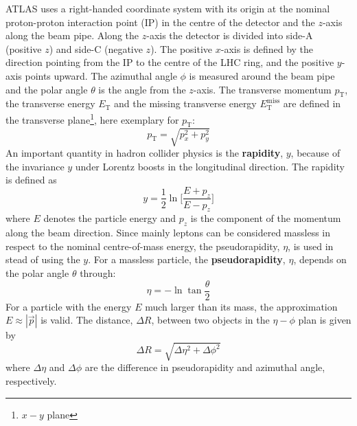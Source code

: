 ATLAS uses a right-handed coordinate system with its origin at the nominal proton-proton interaction point (IP) in the centre of the detector and the $z$-axis along the beam pipe.
Along the $z$-axis the detector is divided into side-A (positive $z$) and side-C (negative $z$).
The positive $x$-axis is defined by the direction pointing from the IP to the centre of the LHC ring, and the positive $y$-axis points upward.%
The azimuthal angle $\phi$ is measured around the beam pipe  and the polar angle $\theta$ is the angle from the $z$-axis.
The transverse momentum $p_{\mathrm{T}}$, the transverse energy $E_{\mathrm{T}}$ and the missing transverse
energy $E_{\mathrm{T}}^{\mathrm{miss}}$ are defined in the transverse plane\footnote{$x-y$ plane}, here exemplary for $p_{\mathrm{T}}$:
%
\begin{equation}
p_{\mathrm{T}}= \sqrt{p_{x}^{2} + p_{y}^{2}}
\end{equation}
%
An important quantity in hadron collider physics is the \textbf{rapidity}, $y$, because of the invariance $y$ under Lorentz boosts in the longitudinal direction.
The rapidity is defined as
%
\begin{equation}
y = \frac{1}{2} \ln\Big[\frac{E + p_{z}}{E - p_{z}}\Big]
\end{equation}
%
where $E$ denotes the particle energy and $p_{z}$  is the component of the momentum along the beam direction.
Since mainly leptons can be considered massless in respect to the nominal centre-of-mass energy, the pseudorapidity, $\eta$, is used in stead of using the $y$.
For a massless particle, the \textbf{pseudorapidity}, $\eta$, depends on the polar angle $\theta$ through:
%
\begin{equation}
\eta = - \ln \tan \frac{\theta}{2}
\end{equation}
%
For a particle with the energy $E$ much larger than its mass, the approximation $E \approx |\vec{p}|$ is valid.
The distance, $\Delta R$, between two objects in the $\eta-\phi$ plan is given by
%
\begin{equation}
\Delta R = \sqrt{\Delta \eta^{2} + \Delta \phi^{2}}
\end{equation}
%
where $\Delta \eta$ and $\Delta \phi$ are the difference in pseudorapidity and azimuthal angle, respectively.

